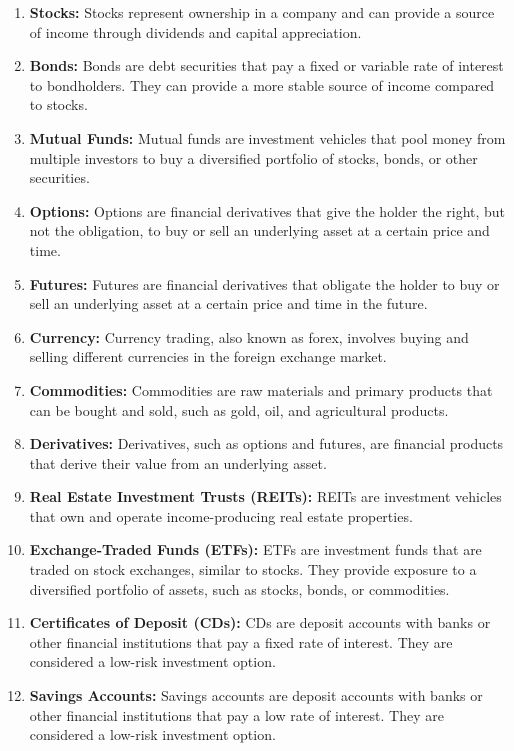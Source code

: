\begin{enumerate}[label=\textbf{\arabic*}., ref=\arabic*]
    \item \textbf{Stocks:} Stocks represent ownership in a company and can provide a source of income through dividends and capital appreciation.
    \item \textbf{Bonds:} Bonds are debt securities that pay a fixed or variable rate of interest to bondholders. They can provide a more stable source of income compared to stocks.
    \item \textbf{Mutual Funds:} Mutual funds are investment vehicles that pool money from multiple investors to buy a diversified portfolio of stocks, bonds, or other securities.
    \item \textbf{Options:} Options are financial derivatives that give the holder the right, but not the obligation, to buy or sell an underlying asset at a certain price and time.
    \item \textbf{Futures:} Futures are financial derivatives that obligate the holder to buy or sell an underlying asset at a certain price and time in the future.
    \item \textbf{Currency:} Currency trading, also known as forex, involves buying and selling different currencies in the foreign exchange market.
    \item \textbf{Commodities:} Commodities are raw materials and primary products that can be bought and sold, such as gold, oil, and agricultural products.
    \item \textbf{Derivatives:} Derivatives, such as options and futures, are financial products that derive their value from an underlying asset.
    \item \textbf{Real Estate Investment Trusts (REITs):} REITs are investment vehicles that own and operate income-producing real estate properties.
    \item \textbf{Exchange-Traded Funds (ETFs):} ETFs are investment funds that are traded on stock exchanges, similar to stocks. They provide exposure to a diversified portfolio of assets, such as stocks, bonds, or commodities.
    \item \textbf{Certificates of Deposit (CDs):} CDs are deposit accounts with banks or other financial institutions that pay a fixed rate of interest. They are considered a low-risk investment option.
    \item \textbf{Savings Accounts:} Savings accounts are deposit accounts with banks or other financial institutions that pay a low rate of interest. They are considered a low-risk investment option.
\end{enumerate}
